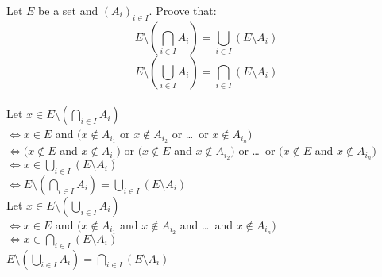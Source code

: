\documentclass{article}
\begin{document}
\noindent Let $E$ be a set and $(A_i)_{i\in I}$. Proove
that:\\
\[
E \setminus (\bigcap_{i \in I}A_i) =
\bigcup_{i \in I}(E \setminus A_i)
\]
\[
E \setminus (\bigcup_{i \in I}A_i) =
\bigcap_{i \in I}(E \setminus A_i)
\]\\

\noindent Let $x \in E \setminus (\bigcap_{i \in I}A_i)$\\
$\iff x \in E $ and $(x \notin A_{i_1}  $ or
$ x \notin A_{i_2} $ or \dots \ or $ x \notin A_{i_n})$\\
$\iff (x \notin E $ and $ x \notin A_{i_1}) $ or
$(x \notin E $ and $ x \notin A_{i_2}) $ or \dots\  or
$(x \notin E $ and $ x \notin A_{i_n})$
$\iff  x \in \bigcup_{i \in I}(E \setminus A_i)$\\
$\iff E \setminus (\bigcap_{i \in I}A_i) =
\bigcup_{i \in I}(E \setminus A_i)$\\


\noindent Let $x \in E \setminus (\bigcup_{i \in I}A_i)$\\
$\iff x \in E $ and $(x \notin A_{i_1}  $ and
$ x \notin A_{i_2} $ and \dots \ and $ x \notin A_{i_n})$\\
$\iff x \in \bigcap_{i \in I}(E \setminus A_i)$\\
$E \setminus (\bigcup_{i \in I}A_i) =
\bigcap_{i \in I}(E \setminus A_i)$
\end{document}
